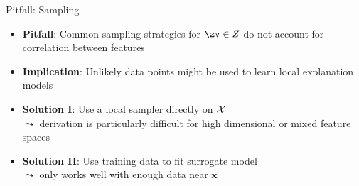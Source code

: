 \documentclass[10pt,compress,t,notes=noshow, xcolor=table]{beamer}
\begin{document}
\begin{frame}[c]{Pitfall: Sampling}
	\begin{itemize}
	\itemsep1em
	  \item \textbf{Pitfall}: Common sampling strategies for $\zv \in Z$ do not account for correlation between features 
      \item \textbf{Implication}:  Unlikely data points might be used to learn local explanation models
      \pause
      \item \textbf{Solution I}: Use a local sampler directly on $\mathcal{X}$\\
      $\leadsto$ derivation is particularly difficult for high dimensional or mixed feature spaces 
      \item \textbf{Solution II}: Use training data to fit surrogate model\\
      $\leadsto$ only works well with enough data near $\mathbf{x}$
    \end{itemize}
    
\end{frame}
\end{document}
